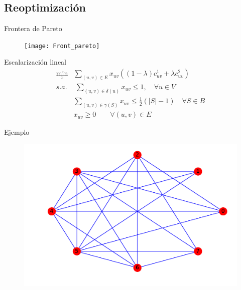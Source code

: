\documentclass{beamer}
\begin{document}
\subsection{Reoptimización}

\begin{frame}{Frontera de Pareto}
\begin{figure}[h!]
\centering
\texttt{[image: Front\_pareto]}
\end{figure}
\end{frame}

\begin{frame}{Escalarización lineal}
\begin{align*}
\min_x & \sum_{(u,v) \in E}x_{uv}((1-\lambda)c^1_{uv}+\lambda c^2_{uv})\\
s.a.&\;\sum_{(u,v)\in\delta(u)} x_{uv} \leq 1, \quad \forall u \in V\\
&\sum_{(u,v)\in \gamma(S)} x_{uv} \leq \frac{1}{2}(|S|-1)\quad \forall S \in B	\\
&x_{uv} \geq 0 \qquad \forall(u,v)\in E
\end{align*}
\end{frame}


\begin{frame}{Ejemplo}
\begin{figure}[h!]
\centering
\includegraphics[scale=0.5]{opt}
\end{figure}
\end{frame}
\end{document}

